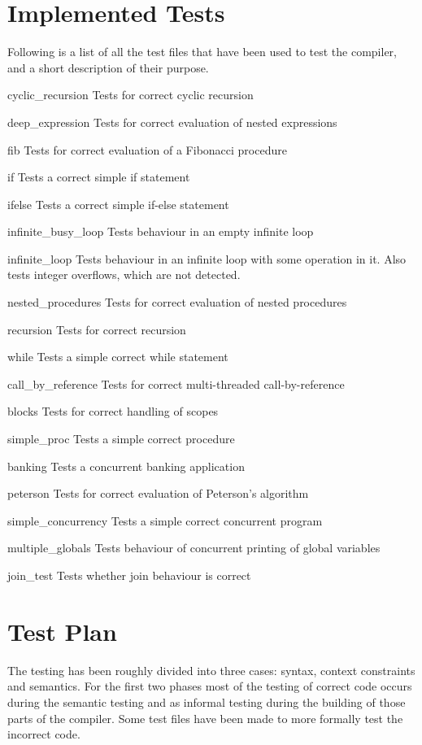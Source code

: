 \documentclass[twoside]{report}
\newenvironment{mycompactdesc}{\begin{adjustwidth}{0.53cm}{}\begin{compactdesc}}{\end{compactdesc}\end{adjustwidth}}
\begin{document}
\section{Implemented Tests}
\label{implemented_tests}
Following is a list of all the test files that have been used to test the compiler, and a short description of their purpose.
\begin{mycompactdesc}
    \item[cyclic\_{}recursion] Tests for correct cyclic recursion
    \item[deep\_{}expression] Tests for correct evaluation of nested expressions
    \item[fib] Tests for correct evaluation of a Fibonacci procedure 
    \item[if] Tests a correct simple if statement
    \item[ifelse] Tests a correct simple if-else statement
    \item[infinite\_{}busy\_{}loop] Tests behaviour in an empty infinite loop
    \item[infinite\_{}loop] Tests behaviour in an infinite loop with some operation in it. Also tests integer overflows, which are not detected.
    \item[nested\_{}procedures] Tests for correct evaluation of nested procedures
    \item[recursion] Tests for correct recursion
    \item[while] Tests a simple correct while statement
    \item[call\_{}by\_{}reference] Tests for correct multi-threaded call-by-reference
    \item[blocks] Tests for correct handling of scopes
    \item[simple\_{}proc] Tests a simple correct procedure
	\item[banking] Tests a concurrent banking application
    \item[peterson] Tests for correct evaluation of Peterson's algorithm
    \item[simple\_{}concurrency] Tests a simple correct concurrent program
    \item[multiple\_{}globals] Tests behaviour of concurrent printing of global variables
    \item[join\_{}test] Tests whether join behaviour is correct
\end{mycompactdesc}


\section{Test Plan}
The testing has been roughly divided into three cases: syntax, context constraints and semantics. For the first two phases most of the testing of correct code occurs during the semantic testing and as informal testing during the building of those parts of the compiler. Some test files have been made to more formally test the incorrect code.
\end{document}
